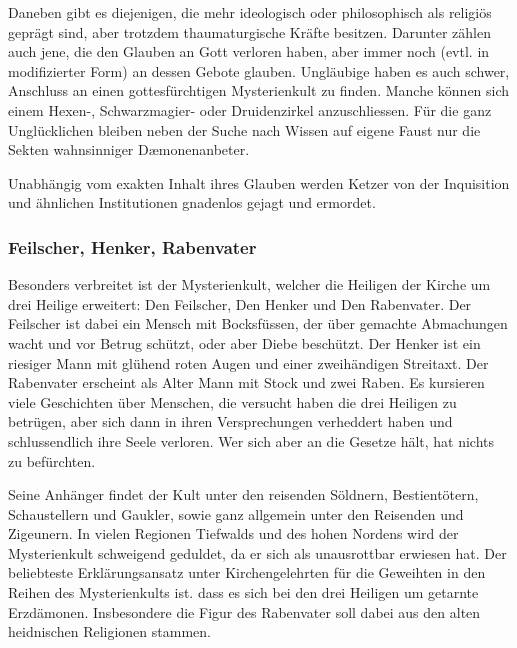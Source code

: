 \documentclass[12pt,twoside,twocolumn,openany]{book}
\begin{document}
	Daneben gibt es diejenigen, die mehr ideologisch oder philosophisch als religiös geprägt sind, aber trotzdem thaumaturgische Kräfte besitzen. Darunter zählen auch jene, die den Glauben an Gott verloren haben, aber immer noch (evtl. in modifizierter Form) an dessen Gebote glauben. Ungläubige haben es auch schwer, Anschluss an einen gottesfürchtigen Mysterienkult zu finden. Manche können sich einem Hexen-, Schwarzmagier- oder Druidenzirkel anzuschliessen. Für die ganz Unglücklichen bleiben neben der Suche nach Wissen auf eigene Faust nur die Sekten wahnsinniger D\ae monenanbeter.
	
	Unabhängig vom exakten Inhalt ihres Glauben werden Ketzer von der Inquisition und ähnlichen Institutionen gnadenlos gejagt und ermordet.
	

	\subsubsection{Feilscher, Henker, Rabenvater}
	Besonders verbreitet ist der Mysterienkult, welcher die Heiligen der Kirche um drei Heilige erweitert: Den Feilscher, Den Henker und Den Rabenvater.
	Der Feilscher ist dabei ein Mensch mit Bocksfüssen, der über gemachte Abmachungen wacht und vor Betrug schützt, oder aber Diebe beschützt. Der Henker ist ein riesiger Mann mit glühend roten Augen und einer zweihändigen Streitaxt. Der Rabenvater erscheint als Alter Mann mit Stock und zwei Raben. Es kursieren viele Geschichten über Menschen, die versucht haben die drei Heiligen zu betrügen, aber sich dann in ihren Versprechungen verheddert haben und schlussendlich ihre Seele verloren. Wer sich aber an die Gesetze hält, hat nichts zu befürchten.
	
	Seine Anhänger findet der Kult unter den reisenden Söldnern, Bestientötern, Schaustellern und Gaukler, sowie ganz allgemein unter den Reisenden und Zigeunern. In vielen Regionen Tiefwalds und des hohen Nordens wird der Mysterienkult schweigend geduldet, da er sich als unausrottbar erwiesen hat. Der beliebteste Erklärungsansatz unter Kirchengelehrten für die Geweihten in den Reihen des Mysterienkults ist. dass es sich bei den drei Heiligen um getarnte Erzdämonen. Insbesondere die Figur des Rabenvater soll dabei aus den alten heidnischen Religionen stammen.
	
\end{document}
